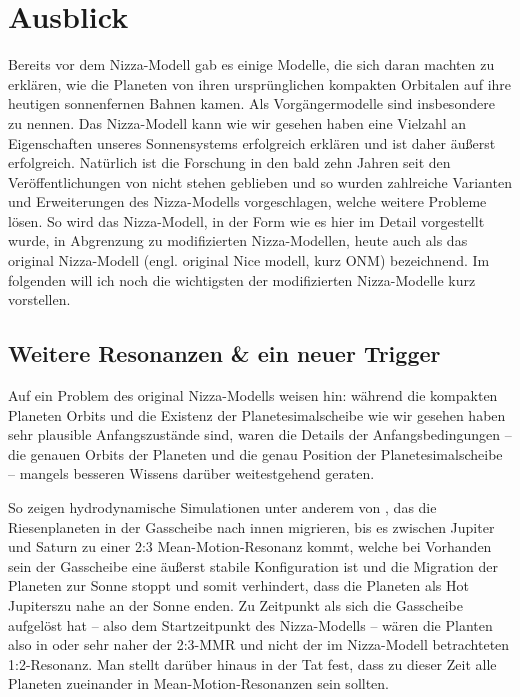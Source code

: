 \documentclass[12pt,a4paper,twoside]{article}
\renewcommand{\cite}{\citep}
\begin{document}
\section{Ausblick}\label{erweiterungen}
Bereits vor dem Nizza-Modell gab es einige Modelle, die sich daran machten zu erklären, wie die Planeten von ihren ursprünglichen kompakten Orbitalen auf ihre heutigen sonnenfernen Bahnen kamen. Als Vorgängermodelle sind insbesondere \cite{Thommes1999,Thommes2003,Levison2004,Gomes2004} zu nennen.
Das Nizza-Modell kann wie wir gesehen haben eine Vielzahl an Eigenschaften unseres Sonnensystems erfolgreich erklären und ist daher äußerst erfolgreich.
Natürlich ist die Forschung in den bald zehn Jahren seit den Veröffentlichungen von \cite{Tsiganis2005,Morbidelli2005,Gomes2005} nicht stehen geblieben und so wurden zahlreiche Varianten und Erweiterungen des Nizza-Modells vorgeschlagen, welche weitere Probleme lösen.
So wird das Nizza-Modell, in der Form wie es hier im Detail vorgestellt wurde, in Abgrenzung zu modifizierten Nizza-Modellen, heute auch als das original Nizza-Modell (engl. \glqq original Nice modell\grqq, kurz ONM) bezeichnend.
Im folgenden will ich noch die wichtigsten der modifizierten Nizza-Modelle kurz vorstellen. %

\subsection{Weitere Resonanzen \& ein neuer Trigger}\label{Nizza2}
Auf ein Problem des original Nizza-Modells weisen \cite{Morbidelli2007a} hin: während die kompakten Planeten Orbits und die Existenz der Planetesimalscheibe wie wir gesehen haben sehr plausible Anfangszustände sind, waren die Details der Anfangsbedingungen -- die genauen Orbits der Planeten und die genau Position der Planetesimalscheibe -- mangels besseren Wissens darüber weitestgehend geraten.

So zeigen hydrodynamische Simulationen unter anderem von \cite{Morbidelli2007a}, das die Riesenplaneten in der Gasscheibe nach innen migrieren, bis es zwischen Jupiter und Saturn zu einer 2:3 Mean-Motion-Resonanz kommt, welche bei Vorhanden sein der Gasscheibe eine äußerst stabile Konfiguration ist und die Migration der Planeten zur Sonne stoppt und somit verhindert, dass die Planeten als \glqq Hot Jupiters\grqq zu nahe an der Sonne enden\cite{Morbidelli2007a}.
Zu Zeitpunkt als sich die Gasscheibe aufgelöst hat -- also dem Startzeitpunkt des Nizza-Modells -- wären die Planten also in oder sehr naher der 2:3-MMR und nicht der im Nizza-Modell betrachteten 1:2-Resonanz.
Man stellt darüber hinaus in der Tat fest, dass zu dieser Zeit alle Planeten zueinander in Mean-Motion-Resonanzen sein sollten.
\end{document}

